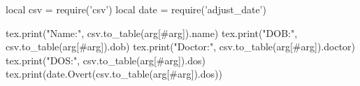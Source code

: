 \documentclass{article}
\begin{document}
\begin{luacode}

local csv = require('csv')
local date = require('adjust_date')

\newcommand{\Name}{csv.to_table(arg[#arg]).name}
\newcommand{\Dob}{csv.to_table(arg[#arg]).dob}
\newcommand{\Doctor}{csv.to_table(arg[#arg]).doctor}
\newcommand{\Dos}{csv.to_table(arg[#arg]).dos}

tex.print("Name:", \Name)
tex.print("DOB:", \Dob)
tex.print("Doctor:", \Doctor)
tex.print("DOS:", \Dos)
tex.print(date.Overt(\Dos))

\end{luacode}
\end{document}
